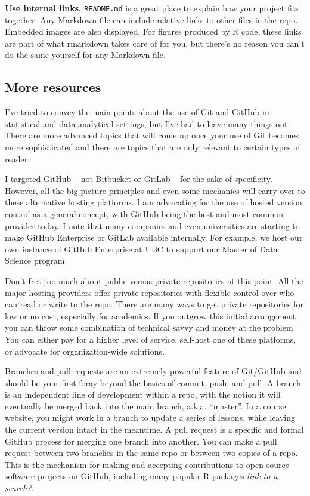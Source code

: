 \documentclass[12pt]{article}
\begin{document}
\textbf{Use internal links.} \texttt{README.md} is a great place to
explain how your project fits together. Any Markdown file can include
relative links to other files in the repo. Embedded images are also
displayed. For figures produced by R code, these links are part of what
rmarkdown takes care of for you, but there's no reason you can't do the
same yourself for any Markdown file.

\subsection{More resources}\label{more-resources}

I've tried to convey the main points about the use of Git and GitHub in
statistical and data analytical settings, but I've had to leave many
things out. There are more advanced topics that will come up once your
use of Git becomes more sophisticated and there are topics that are only
relevant to certain types of reader.

I targeted \href{https://github.com}{GitHub} -- not
\href{https://bitbucket.org}{Bitbucket} or
\href{https://about.gitlab.com}{GitLab} -- for the sake of specificity.
However, all the big-picture principles and even some mechanics will
carry over to these alternative hosting platforms. I am advocating for
the use of hosted version control as a general concept, with GitHub
being the best and most common provider today. I note that many
companies and even universities are starting to make GitHub Enterprise
or GitLab available internally. For example, we host our own instance of
GitHub Enterprise at UBC to support our Master of Data Science program

Don't fret too much about public versus private repositories at this
point. All the major hosting providers offer private repositories with
flexible control over who can read or write to the repo. There are many
ways to get private repositories for low or no cost, especially for
academics. If you outgrow this initial arrangement, you can throw some
combination of technical savvy and money at the problem. You can either
pay for a higher level of service, self-host one of these platforms, or
advocate for organization-wide solutions.

Branches and pull requests are an extremely powerful feature of
Git/GitHub and should be your first foray beyond the basics of commit,
push, and pull. A branch is an independent line of development within a
repo, with the notion it will eventually be merged back into the main
branch, a.k.a. ``master''. In a course website, you might work in a
branch to update a series of lessons, while leaving the current version
intact in the meantime. A pull request is a specific and formal GitHub
process for merging one branch into another. You can make a pull request
between two branches in the same repo or between two copies of a repo.
This is the mechanism for making and accepting contributions to open
source software projects on GitHub, including many popular R packages
\emph{link to a search?}.
\end{document}
